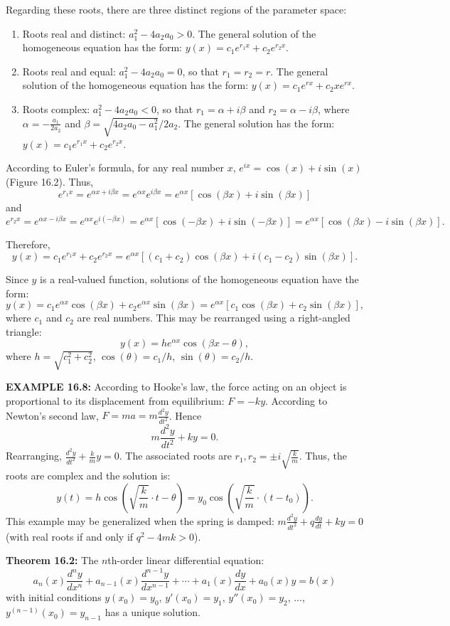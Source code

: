 \begin{original}
Regarding these roots, there are three distinct regions of the parameter space:
\begin{enumerate}
\item Roots real and distinct: $a_1^2 - 4a_2a_0 > 0$. The general solution of the homogeneous equation has the form: $y(x) = c_1 e^{r_1x} + c_2 e^{r_2x}$.
\item Roots real and equal: $a_1^2 - 4a_2a_0 = 0$, so that $r_1 = r_2 = r$. The general solution of the homogeneous equation has the form: $y(x) = c_1 e^{rx} + c_2 x e^{rx}$.
\item Roots complex: $a_1^2 - 4a_2a_0 < 0$, so that $r_1 = \alpha + i\beta$ and $r_2 = \alpha - i\beta$, where $\alpha = -\frac{a_1}{2a_2}$ and $\beta = \sqrt{4a_2a_0 - a_1^2}/2a_2$. The general solution has the form: $y(x) = c_1 e^{r_1x} + c_2 e^{r_2x}$.
\end{enumerate}

According to Euler's formula, for any real number $x$, $e^{ix} = \cos(x) + i \sin(x)$ (Figure 16.2). Thus,
\[
e^{r_1 x} = e^{\alpha x + i\beta x} = e^{\alpha x} e^{i\beta x} = e^{\alpha x}[\cos(\beta x) + i \sin(\beta x)]
\]
and
\[
e^{r_2 x} = e^{\alpha x - i\beta x} = e^{\alpha x} e^{i(-\beta x)} = e^{\alpha x}[\cos(-\beta x) + i \sin(-\beta x)] = e^{\alpha x}[\cos(\beta x) - i \sin(\beta x)].
\]

Therefore,
\[
y(x) = c_1 e^{r_1 x} + c_2 e^{r_2 x} = e^{\alpha x}[(c_1 + c_2) \cos(\beta x) + i(c_1 - c_2) \sin(\beta x)].
\]

Since $y$ is a real-valued function, solutions of the homogeneous equation have the form:
\[
y(x) = c_1 e^{\alpha x} \cos(\beta x) + c_2 e^{\alpha x} \sin(\beta x) = e^{\alpha x}[c_1 \cos(\beta x) + c_2 \sin(\beta x)],
\]
where $c_1$ and $c_2$ are real numbers. This may be rearranged using a right-angled triangle:
\[
y(x) = he^{\alpha x} \cos(\beta x - \theta),
\]
where $h = \sqrt{c_1^2 + c_2^2}$, $\cos(\theta) = c_1/h$, $\sin(\theta) = c_2/h$.

\textbf{EXAMPLE 16.8:} According to Hooke's law, the force acting on an object is proportional to its displacement from equilibrium: $F = -k y$. According to Newton's second law, $F = ma = m\frac{d^2 y}{dt^2}$. Hence
\[
m\frac{d^2 y}{dt^2} + k y = 0.
\]
Rearranging, $\frac{d^2 y}{dt^2} + \frac{k}{m} y = 0$. The associated roots are $r_1, r_2 = \pm i\sqrt{\frac{k}{m}}$. Thus, the roots are complex and the solution is:
\[
y(t) = h \cos\left(\sqrt{\frac{k}{m}} \cdot t - \theta\right) = y_0 \cos\left(\sqrt{\frac{k}{m}} \cdot (t - t_0)\right).
\]
This example may be generalized when the spring is damped: $m\frac{d^2 y}{dt^2} + q\frac{dy}{dt} + k y = 0$ (with real roots if and only if $q^2 - 4mk > 0$).

\textbf{Theorem 16.2:} The $n$th-order linear differential equation:
\[
a_n(x)\frac{d^n y}{dx^n} + a_{n-1}(x)\frac{d^{n-1} y}{dx^{n-1}} + \cdots + a_1(x)\frac{dy}{dx} + a_0(x)y = b(x)
\]
with initial conditions $y(x_0) = y_0$, $y'(x_0) = y_1$, $y''(x_0) = y_2$, $\ldots$, $y^{(n-1)}(x_0) = y_{n-1}$ has a unique solution.
\end{original}
